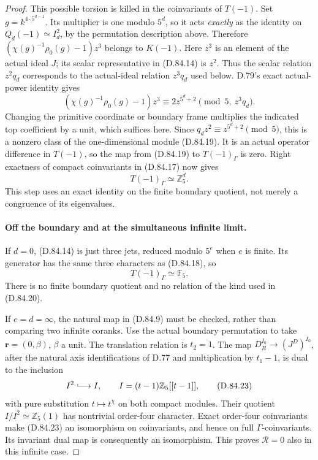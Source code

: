 \begin{proof}
This possible torsion is killed in the coinvariants of
\(T(-1)\). Set \(g=k^{4\cdot5^{d-1}}\). Its multiplier
is one modulo \(5^d\), so it acts \emph{exactly} as the
identity on \(Q_d(-1)\simeq I_d^2\), by the permutation
description above. Therefore
\((\chi(g)^{-1}\rho_0(g)-1)z^3\) belongs to \(K(-1)\).
Here \(z^3\) is an element of the actual ideal \(J\);
its scalar representative in (D.84.14) is \(z^2\).
Thus the scalar relation \(z^2q_d\) corresponds to
the actual-ideal relation \(z^3q_d\) used below.
D.79's exact actual-power identity gives
\[
 (\chi(g)^{-1}\rho_0(g)-1)z^3
             \equiv 2z^{5^d+2}
                  \pmod{5,\ z^3q_d}.                           \tag{D.84.20}
\]
Changing the primitive coordinate or boundary frame multiplies
the indicated top coefficient by a unit, which suffices here.
Since \(q_dz^2\equiv z^{5^d+2}\pmod5\), this is a nonzero
class of the one-dimensional module (D.84.19). It is an actual
operator difference in \(T(-1)\), so the map from (D.84.19)
to \(T(-1)_\Gamma\) is zero. Right exactness of compact
coinvariants in (D.84.17) now gives
\[
                         T(-1)_\Gamma\simeq\mathbb Z_5^d.
                                                                  \tag{D.84.21}
\]
This step uses an exact identity on the finite boundary
quotient, not merely a congruence of its eigenvalues.

\paragraph{Off the boundary and at the simultaneous infinite limit.}
If \(d=0\), (D.84.14) is just three jets, reduced modulo
\(5^e\) when \(e\) is finite. Its generator has the same
three characters as (D.84.18), so
\[
                         T(-1)_\Gamma\simeq\mathbb F_5.
                                                                  \tag{D.84.22}
\]
There is no finite boundary quotient and no relation of
the kind used in (D.84.20).

If \(e=d=\infty\), the natural map in (D.84.9) must be
checked, rather than comparing two infinite coranks.
Use the actual boundary permutation to take
\(\mathbf r=(0,\beta)\), \(\beta\) a unit.
The translation relation is \(t_2=1\).
The map \(D_R^{I_0}\to(J^D)^{I_0}\), after the natural
axis identifications of D.77 and multiplication by
\(t_1-1\), is dual to the inclusion
\[
 I^2\lhook\joinrel\longrightarrow I,
 \qquad I=(t-1)\mathbb Z_5[[t-1]],
                                                                  \tag{D.84.23}
\]
with pure substitution \(t\mapsto t^\chi\) on both compact
modules. Their quotient \(I/I^2\simeq\mathbb Z_5(1)\)
has nontrivial order-four character. Exact order-four
coinvariants make (D.84.23) an isomorphism on coinvariants,
and hence on full \(\Gamma\)-coinvariants. Its invariant
dual map is consequently an isomorphism. This proves
\(\mathcal R=0\) also in this infinite case.


\end{proof}
